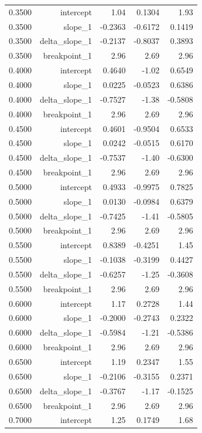 \begin{longtable}{lrrrr}
  0.3500 & intercept & 1.04 & 0.1304 & 1.93 \\
  0.3500 & slope\_1 & -0.2363 & -0.6172 & 0.1419 \\
  0.3500 & delta\_slope\_1 & -0.2137 & -0.8037 & 0.3893 \\
  0.3500 & breakpoint\_1 & 2.96 & 2.69 & 2.96 \\
  0.4000 & intercept & 0.4640 & -1.02 & 0.6549 \\
  0.4000 & slope\_1 & 0.0225 & -0.0523 & 0.6386 \\
  0.4000 & delta\_slope\_1 & -0.7527 & -1.38 & -0.5808 \\
  0.4000 & breakpoint\_1 & 2.96 & 2.69 & 2.96 \\
  0.4500 & intercept & 0.4601 & -0.9504 & 0.6533 \\
  0.4500 & slope\_1 & 0.0242 & -0.0515 & 0.6170 \\
  0.4500 & delta\_slope\_1 & -0.7537 & -1.40 & -0.6300 \\
  0.4500 & breakpoint\_1 & 2.96 & 2.69 & 2.96 \\
  0.5000 & intercept & 0.4933 & -0.9975 & 0.7825 \\
  0.5000 & slope\_1 & 0.0130 & -0.0984 & 0.6379 \\
  0.5000 & delta\_slope\_1 & -0.7425 & -1.41 & -0.5805 \\
  0.5000 & breakpoint\_1 & 2.96 & 2.69 & 2.96 \\
  0.5500 & intercept & 0.8389 & -0.4251 & 1.45 \\
  0.5500 & slope\_1 & -0.1038 & -0.3199 & 0.4427 \\
  0.5500 & delta\_slope\_1 & -0.6257 & -1.25 & -0.3608 \\
  0.5500 & breakpoint\_1 & 2.96 & 2.69 & 2.96 \\
  0.6000 & intercept & 1.17 & 0.2728 & 1.44 \\
  0.6000 & slope\_1 & -0.2000 & -0.2743 & 0.2322 \\
  0.6000 & delta\_slope\_1 & -0.5984 & -1.21 & -0.5386 \\
  0.6000 & breakpoint\_1 & 2.96 & 2.69 & 2.96 \\
  0.6500 & intercept & 1.19 & 0.2347 & 1.55 \\
  0.6500 & slope\_1 & -0.2106 & -0.3155 & 0.2371 \\
  0.6500 & delta\_slope\_1 & -0.3767 & -1.17 & -0.1525 \\
  0.6500 & breakpoint\_1 & 2.96 & 2.69 & 2.96 \\
  0.7000 & intercept & 1.25 & 0.1749 & 1.68 \\

\end{longtable}
